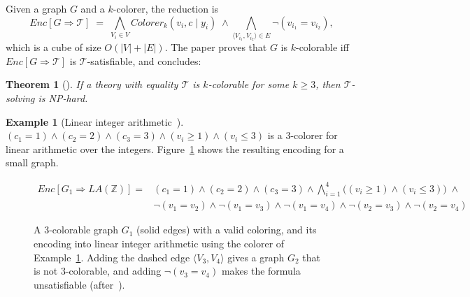 \documentclass[12pt,a4paper]{article}
\newcommand{\T}{\mathcal{T}}
\newcommand{\Colorer}{\mathit{Colorer}}
\newcommand{\Enc}{\mathit{Enc}}
\newtheorem{theorem}{Theorem}
\theoremstyle{definition}
\newtheorem{example}{Example}
\begin{document}
Given a graph $G$ and a $k$-colorer, the reduction is
\begin{equation}\label{eq:enc}
  \Enc[G \Rightarrow \T] \;=\;
  \bigwedge_{V_i \in V} \Colorer_k(v_i, c \mid y_i) \;\wedge
  \bigwedge_{\langle V_{i_1}, V_{i_2} \rangle \in E} \neg(v_{i_1} = v_{i_2}),
\end{equation}
which is a cube of size $O(|V| + |E|)$. The paper proves that $G$ is $k$-colorable
iff $\Enc[G \Rightarrow \T]$ is $\T$-satisfiable, and concludes:

\begin{theorem}[\cite{Sebastiani16}]
If a theory with equality $\T$ is $k$-colorable for some $k \geq 3$, then
$\T$-solving is NP-hard.
\end{theorem}

\begin{example}[Linear integer arithmetic~\cite{Sebastiani16}]\label{ex:lia}
$(c_1 = 1) \wedge (c_2 = 2) \wedge (c_3 = 3) \wedge (v_i \geq 1) \wedge (v_i \leq 3)$
is a 3-colorer for linear arithmetic over the integers. Figure~\ref{fig:example}
shows the resulting encoding for a small graph.
\end{example}

\begin{figure}[t]
  \centering
  \[
    \begin{aligned}
      \Enc[G_1 \Rightarrow LA(\mathbb{Z})] = {}&
        (c_1 = 1) \wedge (c_2 = 2) \wedge (c_3 = 3) \wedge
        \textstyle\bigwedge_{i=1}^{4} \big((v_i \geq 1) \wedge (v_i \leq 3)\big) \;\wedge \\
      & \neg(v_1 = v_2) \wedge \neg(v_1 = v_3) \wedge \neg(v_1 = v_4) \wedge
        \neg(v_2 = v_3) \wedge \neg(v_2 = v_4)
    \end{aligned}
  \]
  \caption{A 3-colorable graph $G_1$ (solid edges) with a valid coloring, and its
  encoding into linear integer arithmetic using the colorer of
  Example~\ref{ex:lia}. Adding the dashed edge $\langle V_3, V_4 \rangle$ gives a
  graph $G_2$ that is not 3-colorable, and adding $\neg(v_3 = v_4)$ makes the
  formula unsatisfiable (after~\cite[Fig.~1]{Sebastiani16}).}
  \label{fig:example}
\end{figure}
\end{document}
